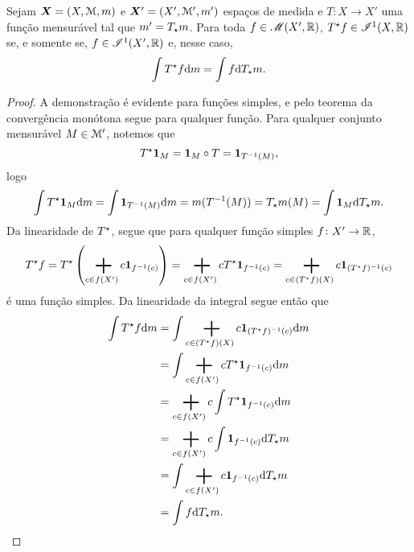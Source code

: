 \begin{proposition}
Sejam $\bm X = (X,\mathcal{M},m)$ e $\bm X'=(X',\mathcal{M}',m')$ espaços de medida e $T\colon X \to X'$ uma função mensurável tal que $m' = T_\star m$. Para toda $f \in \mathscr{M}(X',\mathbb{R})$, $T^\star f \in \mathscr{I}^1(X,\mathbb{R})$ se, e somente se, $f \in \mathscr{I}^1(X',\mathbb{R})$ e, nesse caso,
	\begin{equation*}
	\int T^\star f \mathrm{d}m = \int f \mathrm{d} T_\star m.
	\end{equation*}
\end{proposition}
\begin{proof}
A demonstração é evidente para funções simples, e pelo teorema da convergência monótona segue para qualquer função. Para qualquer conjunto mensurável $M \in \mathcal{M}'$, notemos que
	\begin{equation*}
	T^\star {\bm 1}_{M} = {\bm 1}_{M} \circ T = {\bm 1}_{T^{-1}(M)},
	\end{equation*}
logo
	\begin{equation*}
	\int T^\star {\bm 1}_{M} \mathrm{d}m = \int {\bm 1}_{T^{-1}(M)} \mathrm{d}m = m(T^{-1}(M)) = T_\star m(M) = \int {\bm 1}_M \mathrm{d} T_\star m.
	\end{equation*}
Da linearidade de $T^\star$, segue que para qualquer função simples $f\colon X' \to \mathbb{R}$,%
	\begin{equation*}
	T\pux f = T\pux \left( \sum_{c \in f(X')} c\idc_{f\inv(c)} \right) = \sum_{c \in f(X')} c T\pux \idc_{f\inv(c)} = \sum_{c \in (T\pux f)(X)} c \idc_{(T\pux f)\inv(c)}
	\end{equation*}
é uma função simples. Da linearidade da integral segue então que
	\begin{align*}
	\int T\pux f \dd\med &= \int \sum_{c \in (T\pux f)(X)} c \idc_{(T\pux f)\inv(c)} \dd\med \\
		&= \int \sum_{c \in f(X')} c T\pux \idc_{f\inv(c)} \dd\med \\
		&= \sum_{c \in f(X')} c \int T\pux \idc_{f\inv(c)} \dd\med \\
		&= \sum_{c \in f(X')} c \int \idc_{f\inv(c)} \dd T\emp \med \\
		&= \int \sum_{c \in f(X')} c \idc_{f\inv(c)} \dd T\emp \med \\
		&= \int f \dd T\emp\med.

\end{align*}
\end{proof}
